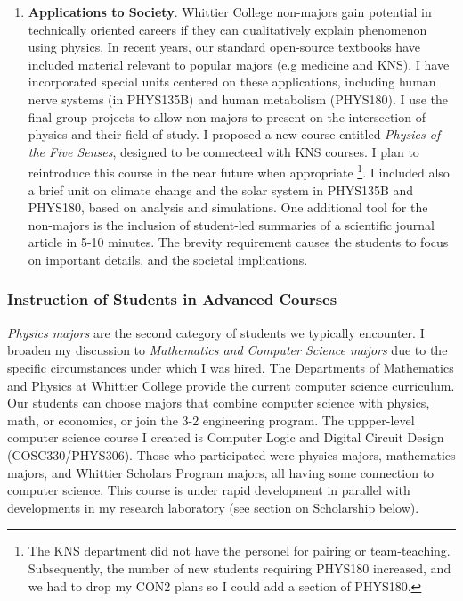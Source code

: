 \documentclass[../../main.tex]{subfiles}
\begin{document}
\begin{enumerate}
\item \textbf{Applications to Society}. Whittier College non-majors gain potential in technically oriented careers if they can qualitatively explain phenomenon using physics.  In recent years, our standard open-source textbooks have included material relevant to popular majors (e.g medicine and KNS). I have incorporated special units centered on these applications, including human nerve systems (in PHYS135B) and human metabolism (PHYS180).  I use the final group projects to allow non-majors to present on the intersection of physics and their field of study.  I proposed a new course entitled \textit{Physics of the Five Senses}, designed to be connecteed with KNS courses.  I plan to reintroduce this course in the near future when appropriate \footnote{The KNS department did not have the personel for pairing or team-teaching.  Subsequently, the number of new students requiring PHYS180 increased, and we had to drop my CON2 plans so I could add a section of PHYS180.}. I included also a brief unit on climate change and the solar system in PHYS135B and PHYS180, based on analysis and simulations.  One additional tool for the non-majors is the inclusion of student-led summaries of a scientific journal article in 5-10 minutes.  The brevity requirement causes the students to focus on important details, and the societal implications.
\end{enumerate}

\subsubsection{Instruction of Students in Advanced Courses}

\label{sec:teaching_phil2}

\textit{Physics majors} are the second category of students we typically encounter.  I broaden my discussion to \textit{Mathematics and Computer Science majors} due to the specific circumstances under which I was hired.  The Departments of Mathematics and Physics at Whittier College provide the current computer science curriculum.  Our students can choose majors that combine computer science with physics, math, or economics, or join the 3-2 engineering program.  The uppper-level computer science course I created is Computer Logic and Digital Circuit Design (COSC330/PHYS306).  Those who participated were physics majors, mathematics majors, and Whittier Scholars Program majors, all having some connection to computer science.  This course is under rapid development in parallel with developments in my research laboratory (see section on Scholarship below). \\ \hspace{0.1cm}
\end{document}
